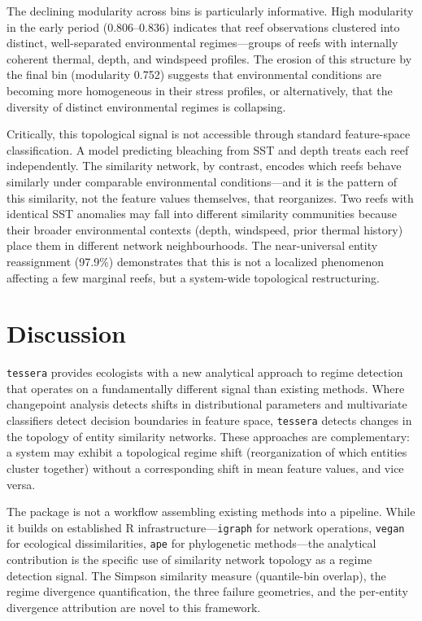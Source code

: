 \documentclass[12pt]{article}
\begin{document}
The declining modularity across bins is particularly informative. High modularity in the early period (0.806--0.836) indicates that reef observations clustered into distinct, well-separated environmental regimes---groups of reefs with internally coherent thermal, depth, and windspeed profiles. The erosion of this structure by the final bin (modularity 0.752) suggests that environmental conditions are becoming more homogeneous in their stress profiles, or alternatively, that the diversity of distinct environmental regimes is collapsing.

Critically, this topological signal is not accessible through standard feature-space classification. A model predicting bleaching from SST and depth treats each reef independently. The similarity network, by contrast, encodes which reefs behave similarly under comparable environmental conditions---and it is the pattern of this similarity, not the feature values themselves, that reorganizes. Two reefs with identical SST anomalies may fall into different similarity communities because their broader environmental contexts (depth, windspeed, prior thermal history) place them in different network neighbourhoods. The near-universal entity reassignment (97.9\%) demonstrates that this is not a localized phenomenon affecting a few marginal reefs, but a system-wide topological restructuring.


\section{Discussion}

\texttt{tessera} provides ecologists with a new analytical approach to regime detection that operates on a fundamentally different signal than existing methods. Where changepoint analysis \citep{Killick2014} detects shifts in distributional parameters and multivariate classifiers detect decision boundaries in feature space, \texttt{tessera} detects changes in the topology of entity similarity networks. These approaches are complementary: a system may exhibit a topological regime shift (reorganization of which entities cluster together) without a corresponding shift in mean feature values, and vice versa.

The package is not a workflow assembling existing methods into a pipeline. While it builds on established R infrastructure---\texttt{igraph} for network operations, \texttt{vegan} for ecological dissimilarities, \texttt{ape} for phylogenetic methods---the analytical contribution is the specific use of similarity network topology as a regime detection signal. The Simpson similarity measure (quantile-bin overlap), the regime divergence quantification, the three failure geometries, and the per-entity divergence attribution are novel to this framework.
\end{document}
